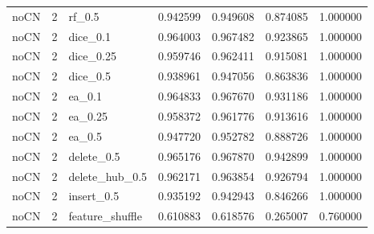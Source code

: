 \documentclass[UTF8,a4paper,11pt,fontset=fandol]{ctexart}
\begin{document}
{\begin{longtable}{lrlrrrr}
noCN & 2 & rf\_0.5 & 0.942599 & 0.949608 & 0.874085 & 1.000000 \\
noCN & 2 & dice\_0.1 & 0.964003 & 0.967482 & 0.923865 & 1.000000 \\
noCN & 2 & dice\_0.25 & 0.959746 & 0.962411 & 0.915081 & 1.000000 \\
noCN & 2 & dice\_0.5 & 0.938961 & 0.947056 & 0.863836 & 1.000000 \\
noCN & 2 & ea\_0.1 & 0.964833 & 0.967670 & 0.931186 & 1.000000 \\
noCN & 2 & ea\_0.25 & 0.958372 & 0.961776 & 0.913616 & 1.000000 \\
noCN & 2 & ea\_0.5 & 0.947720 & 0.952782 & 0.888726 & 1.000000 \\
noCN & 2 & delete\_0.5 & 0.965176 & 0.967870 & 0.942899 & 1.000000 \\
noCN & 2 & delete\_hub\_0.5 & 0.962171 & 0.963854 & 0.926794 & 1.000000 \\
noCN & 2 & insert\_0.5 & 0.935192 & 0.942943 & 0.846266 & 1.000000 \\
noCN & 2 & feature\_shuffle & 0.610883 & 0.618576 & 0.265007 & 0.760000 \\
\end{longtable}
}
\end{document}
